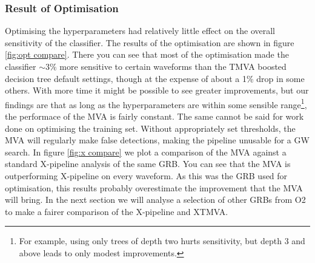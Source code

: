 \documentclass[11pt]{cuthesis}
\newcommand{\xp}{X-pipeline }
\begin{document}
\subsubsection{Result of Optimisation}
Optimising the hyperparameters had relatively little effect on the overall sensitivity of the classifier. The results of the optimisation are shown in figure \ref{fig:opt compare}. There you can see that most of the optimisation made the classifier $\sim 3\%$  more sensitive to certain waveforms than the TMVA boosted decision tree default settings, though at the expense of about a 1\% drop in some others. With more time it might be possible to see greater improvements, but our findings are that as long as the hyperparameters are within some sensible range\footnote{For example, using only trees of depth two hurts sensitivity, but depth 3 and above leads to only modest improvements.}, the performace of the MVA is fairly constant. The same cannot be said for work done on optimising the training set. Without appropriately set thresholds, the MVA will regularly make false detections, making the pipeline unusable for a GW search. In figure \ref{fig:x compare} we plot a comparison of the MVA against a standard \xp analysis of the same GRB. You can see that the MVA is outperforming \xp on every waveform. As this was the GRB used for optimisation, this results probably overestimate the improvement that the MVA will bring. In the next section we will analyse a selection of other GRBs from O2 to make a fairer comparison of the \xp and XTMVA.
\end{document}
